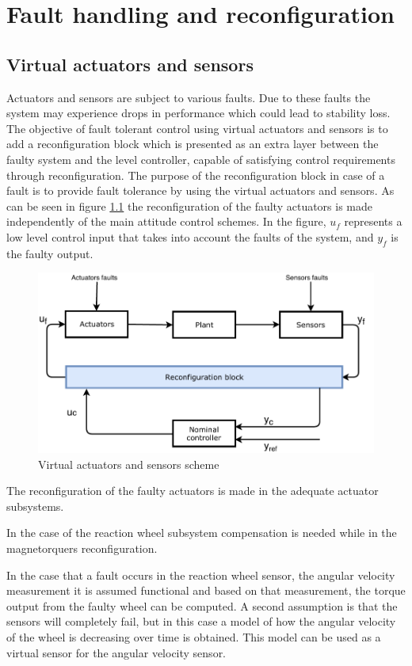 \chapter{Fault handling and reconfiguration}  \label{chap:faltHandling}
 \section{Virtual actuators and sensors} \label{chap: virtual}
 Actuators and sensors are subject to various faults. Due to these faults the system may experience drops in performance which could lead to stability loss. The objective of fault tolerant control using virtual actuators and sensors is to add a reconfiguration block which is presented as an extra layer between the faulty system and the level controller, capable of satisfying control requirements through reconfiguration. The purpose of the reconfiguration block in case of a fault is to provide fault tolerance by using the virtual actuators and sensors. As can be seen in figure \ref{fig:VA} the reconfiguration of the faulty actuators is made independently of the main attitude control schemes.  In the figure, $u_f$ represents a low level control input that takes into account the faults of the system, and $y_f$ is the faulty output. 
 \begin{figure}[H]
 	\centering
 	\includegraphics[width=0.8\linewidth]{figures/VirtualActuator}
 	\caption{ Virtual actuators and sensors scheme}
 	\label{fig:VA}
 \end{figure}
 
 The reconfiguration of the faulty actuators is made in the adequate actuator subsystems. 
 
 In the case of the reaction wheel subsystem compensation is needed while in the magnetorquers reconfiguration.
 
 In the case that a fault occurs in the reaction wheel sensor, the angular velocity measurement it is assumed functional and based on that measurement, the torque output from the faulty wheel can be computed. A second assumption is that the sensors will completely fail, but in this case a model of how the angular velocity of the wheel is decreasing over time is obtained. This model can be used as a virtual sensor for the angular velocity sensor. 
 
